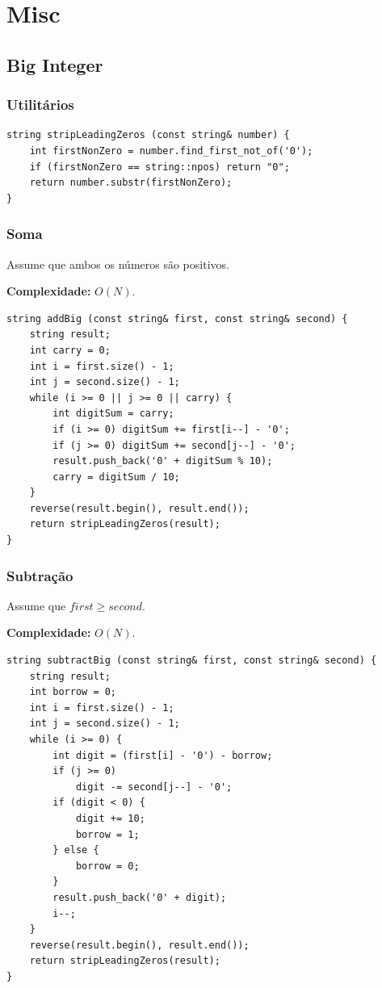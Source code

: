 \section{Misc}

\subsection{Big Integer}

\subsubsection{Utilitários}

\begin{lstlisting}
string stripLeadingZeros (const string& number) {
    int firstNonZero = number.find_first_not_of('0');
    if (firstNonZero == string::npos) return "0";
    return number.substr(firstNonZero);
}
\end{lstlisting}

\subsubsection{Soma}

Assume que ambos os números são positivos.

\textbf{Complexidade:} $O(N)$.

\begin{lstlisting}
string addBig (const string& first, const string& second) {
    string result;
    int carry = 0;
    int i = first.size() - 1;
    int j = second.size() - 1;
    while (i >= 0 || j >= 0 || carry) {
        int digitSum = carry;
        if (i >= 0) digitSum += first[i--] - '0';
        if (j >= 0) digitSum += second[j--] - '0';
        result.push_back('0' + digitSum % 10);
        carry = digitSum / 10;
    }
    reverse(result.begin(), result.end());
    return stripLeadingZeros(result);
}
\end{lstlisting}



\subsubsection{Subtração}

Assume que $first \geq second$.

\textbf{Complexidade:} $O(N)$.

\begin{lstlisting}
string subtractBig (const string& first, const string& second) {
    string result;
    int borrow = 0;
    int i = first.size() - 1;
    int j = second.size() - 1;
    while (i >= 0) {
        int digit = (first[i] - '0') - borrow;
        if (j >= 0)
            digit -= second[j--] - '0';
        if (digit < 0) {
            digit += 10;
            borrow = 1;
        } else {
            borrow = 0;
        }
        result.push_back('0' + digit);
        i--;
    }
    reverse(result.begin(), result.end());
    return stripLeadingZeros(result);
}
\end{lstlisting}



